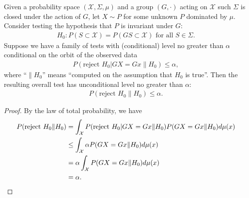 \begin{thm}
Given a probability space $(\mathcal{X}, \Sigma, \mu)$ and a group $(G, \cdot)$
acting on $\mathcal{X}$ such  $\Sigma$ is closed under the action of $G$,  
let $X \sim P$ for some unknown $P$ dominated by $\mu$.
Consider testing the hypothesis that $P$ is invariant under $G$:
\begin{align*}
H_0: P(S \subset \mathcal{X}) = P(GS  \subset \mathcal{X}) \text{  for all }S \in \Sigma.
\end{align*}
Suppose we have a family of tests with (conditional) level no greater than $\alpha$ conditional on the orbit of
the observed data
\begin{align*}
P(\text{reject }H_0 | GX=Gx \| H_0) \le \alpha,
\end{align*}
where ``$\| H_0$'' means ``computed on the assumption that $H_0$ is true''.
Then the resulting overall test has unconditional level no greater than $\alpha$:
\begin{align*}
P(\text{reject }H_0  \| H_0) \le \alpha.
\end{align*}
\end{thm}

\begin{proof}
By the law of total probability, we have
\begin{align*}
P(\text{reject }H_0  \| H_0) &= \int_\mathcal{X} P(\text{reject }H_0 | GX=Gx \| H_0)P(GX=Gx \| H_0)d\mu(x) \\
  &\le \int_\mathcal{X} \alpha P(GX=Gx \| H_0)d\mu(x) \\
  &= \alpha \int_\mathcal{X} P(GX=Gx \| H_0)d\mu(x) \\
  &= \alpha.  \qedhere
\end{align*}
\end{proof}
